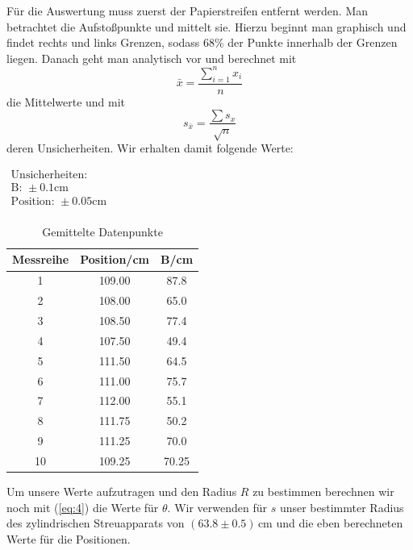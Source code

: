 \documentclass[11pt,a4paper]{article}
\begin{document}
F\"ur die Auswertung muss zuerst der Papierstreifen entfernt werden. Man betrachtet die Aufsto\ss punkte und mittelt sie. Hierzu beginnt man graphisch und findet rechts und links Grenzen, sodass 68\% der Punkte innerhalb der Grenzen liegen. Danach geht man analytisch vor und berechnet mit
\begin{equation}
\bar{x}=\frac{\sum_{i=1}^n x_i}{n}\label{mean}
\end{equation}
die Mittelwerte und mit
\begin{equation}
s_{\bar{x}}=\frac{\sum{s_x}}{\sqrt{n}}\label{meanstd}
\end{equation}
deren Unsicherheiten. Wir erhalten damit folgende Werte:

\begin{table}[h]
\centering
\caption{Gemittelte Datenpunkte} \vspace{11pt}
$\begin{array}{l}
\textrm{Unsicherheiten:}\\
\textrm{B: } \pm 0.1 \textrm{cm}\\
\textrm{Position: } \pm 0.05 \textrm{cm}\\
\end{array}$
\begin{tabular}{ccc}
\toprule
\textrm{Messreihe} & \textrm{Position}/\textrm{cm} & \textrm{B}/\textrm{cm} \\
\midrule 
1 & 109.00 & 87.8 \\
2 & 108.00 & 65.0 \\
3 & 108.50 & 77.4 \\
4 & 107.50 & 49.4\\
5 & 111.50 & 64.5 \\
6 & 111.00 & 75.7\\
7 & 112.00 & 55.1 \\
8 & 111.75 & 50.2 \\
9 & 111.25 & 70.0 \\
10 & 109.25 & 70.25 \\ 
\bottomrule
\end{tabular}
\label{Tab:1}
\end{table}

Um unsere Werte aufzutragen und den Radius $R$ zu bestimmen berechnen wir noch mit (\ref{eq:4}) die Werte f\"ur $\theta$. Wir verwenden f\"ur $s$ unser bestimmter Radius des zylindrischen Streuapparats von $(63.8\pm0.5)$\,cm und die eben berechneten Werte f\"ur die Positionen.
\end{document}
